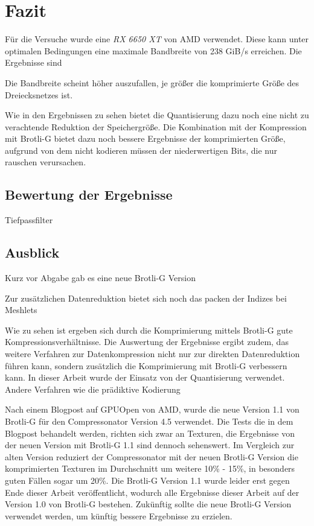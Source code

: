 \section{Fazit}
\label{sec:fazit}
Für die Versuche wurde eine \textit{RX 6650 XT} von AMD verwendet.
Diese kann unter optimalen Bedingungen eine maximale Bandbreite von 238 GiB/s erreichen.
Die Ergebnisse sind 

Die Bandbreite scheint höher auszufallen, je größer die komprimierte Größe des Dreiecksnetzes ist.

Wie in den Ergebnissen zu sehen bietet die Quantisierung dazu noch eine nicht zu verachtende Reduktion der Speichergröße.
Die Kombination mit der Kompression mit Brotli-G bietet dazu noch bessere Ergebnisse der komprimierten Größe, aufgrund von dem nicht kodieren müssen der niederwertigen Bits, die nur rauschen verursachen.

\subsection{Bewertung der Ergebnisse}
\label{subsec:bewertung}

Tiefpassfilter

\subsection{Ausblick}
\label{subsec:ausblick}
Kurz vor Abgabe gab es eine neue Brotli-G Version 

Zur zusätzlichen Datenreduktion bietet sich noch das packen der Indizes bei Meshlets

Wie zu sehen ist ergeben sich durch die Komprimierung mittels Brotli-G gute Kompressionsverhältnisse.
Die Auswertung der Ergebnisse ergibt zudem, das weitere Verfahren zur Datenkompression nicht nur zur direkten Datenreduktion führen kann, sondern zusätzlich die Komprimierung mit Brotli-G verbessern kann.
In dieser Arbeit wurde der Einsatz von der Quantisierung verwendet.
Andere Verfahren wie die prädiktive Kodierung 

Nach einem Blogpost auf GPUOpen von AMD, wurde die neue Version 1.1 von Brotli-G für den Compressonator Version 4.5 verwendet.
Die Tests die in dem Blogpost behandelt werden, richten sich zwar an Texturen, die Ergebnisse von der neuen Version mit Brotli-G 1.1 sind dennoch sehenswert.
Im Vergleich zur alten Version reduziert der Compressonator mit der neuen Brotli-G Version die komprimierten Texturen im Durchschnitt um weitere 10\% - 15\%, in besonders guten Fällen sogar um 20\%.
Die Brotli-G Version 1.1 wurde leider erst gegen Ende dieser Arbeit veröffentlicht, wodurch alle Ergebnisse dieser Arbeit auf der Version 1.0 von Brotli-G bestehen.
Zukünftig sollte die neue Brotli-G Version verwendet werden, um künftig bessere Ergebnisse zu erzielen.

